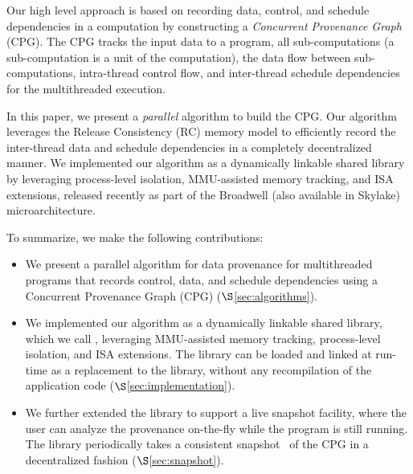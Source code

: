 Our high level approach is based on recording data, control, and schedule dependencies in a computation by constructing a {\em Concurrent Provenance Graph} (CPG). The CPG tracks the input data to a program, all sub-computations (a sub-computation is a unit of the computation), the data flow between sub-computations, intra-thread control flow, and inter-thread schedule dependencies for the multithreaded execution. 


In this paper, we present a {\em parallel} algorithm to build the CPG. Our algorithm leverages the Release Consistency (RC) memory model to efficiently record the inter-thread data and schedule dependencies in a completely decentralized manner. We implemented our algorithm as a dynamically linkable shared library by leveraging process-level isolation, MMU-assisted memory tracking, and \intelpt ISA extensions, released recently as part of the Broadwell (also available in Skylake) microarchitecture. 



To summarize, we make the following contributions:
\begin{itemize}

\item We present a parallel algorithm for data provenance for multithreaded programs that records control, data, and schedule dependencies using a Concurrent Provenance Graph (CPG) ($\S$\ref{sec:algorithms}).

\item We implemented our algorithm as a dynamically linkable shared library, which we call \projecttitle, leveraging MMU-assisted memory tracking, process-level isolation, and \intelpt ISA extensions.  The \projecttitle library can be loaded and linked at run-time as a replacement to the \pthreads library, without any recompilation  of the application code ($\S$\ref{sec:implementation}).

\item We further extended the library to support a live snapshot facility, where the user can analyze the provenance on-the-fly while the program is still running. The library periodically takes a consistent snapshot~\cite{chandy-lamport} of the CPG in a decentralized fashion ($\S$\ref{sec:snapshot}).



\end{itemize}



